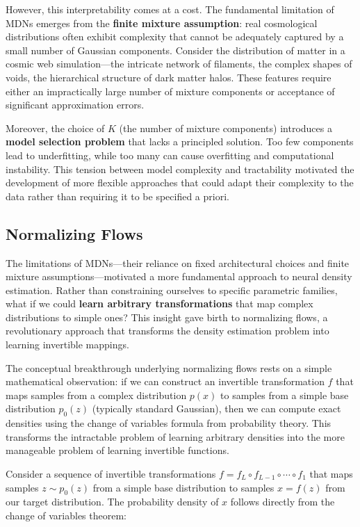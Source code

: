 \documentclass{SciPost}
\begin{document}
However, this interpretability comes at a cost. The fundamental limitation of MDNs emerges from the \textbf{finite mixture assumption}: real cosmological distributions often exhibit complexity that cannot be adequately captured by a small number of Gaussian components. Consider the distribution of matter in a cosmic web simulation—the intricate network of filaments, the complex shapes of voids, the hierarchical structure of dark matter halos. These features require either an impractically large number of mixture components or acceptance of significant approximation errors.

Moreover, the choice of $K$ (the number of mixture components) introduces a \textbf{model selection problem} that lacks a principled solution. Too few components lead to underfitting, while too many can cause overfitting and computational instability. This tension between model complexity and tractability motivated the development of more flexible approaches that could adapt their complexity to the data rather than requiring it to be specified a priori.

\subsection{Normalizing Flows}

The limitations of MDNs—their reliance on fixed architectural choices and finite mixture assumptions—motivated a more fundamental approach to neural density estimation. Rather than constraining ourselves to specific parametric families, what if we could \textbf{learn arbitrary transformations} that map complex distributions to simple ones? This insight gave birth to normalizing flows, a revolutionary approach that transforms the density estimation problem into learning invertible mappings.

The conceptual breakthrough underlying normalizing flows rests on a simple mathematical observation: if we can construct an invertible transformation $f$ that maps samples from a complex distribution $p(x)$ to samples from a simple base distribution $p_0(z)$ (typically standard Gaussian), then we can compute exact densities using the change of variables formula from probability theory. This transforms the intractable problem of learning arbitrary densities into the more manageable problem of learning invertible functions.

Consider a sequence of invertible transformations $f = f_L \circ f_{L-1} \circ \cdots \circ f_1$ that maps samples $z \sim p_0(z)$ from a simple base distribution to samples $x = f(z)$ from our target distribution. The probability density of $x$ follows directly from the change of variables theorem:
\end{document}
